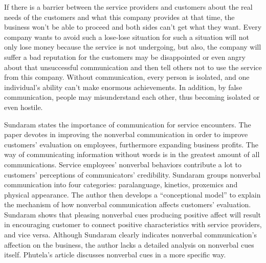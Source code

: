 \documentclass[12pt]{article}
\begin{document}
\begin{flushleft}
If there is a barrier between the service providers and customers about the real
needs of the customers and what this company provides at that time, the
business won't be able to proceed and both sides can't get what they want. Every
company wants to avoid such a lose-lose situation for such a situation will not
only lose money because the service is not undergoing, but also, the company
will suffer a bad reputation for the customers may be disappointed or even angry
about that unsuccessful communication and then tell others not to use the
service from this company.
Without communication, every person is isolated, and one individual's ability
can't make enormous achievements. In addition, by false communication, people
may misunderstand each other, thus becoming isolated or even hostile.


Sundaram states the importance of communication for service encounters.
The paper devotes in improving the nonverbal communication in order to improve
customers' evaluation on employees, furthermore expanding business profits. 
The way of communicating information without words is in the greatest amount of all
communications. Service employees' nonverbal behaviors contribute a lot to
customers' perceptions of communicators' credibility. Sundaram groups nonverbal
communication into four categories: paralanguage, kinetics, proxemics and
physical appearance. The author then develops a ``conceptional model'' to
explain the mechanism of how nonverbal communication affects customers'
evaluation. Sundaram shows that pleasing nonverbal cues producing positive
affect will result in encouraging customer to connect positive characteristics
with service providers, and vice versa. Although Sundaram clearly indicates 
nonverbal communication's affection on the business, the author lacks a detailed
analysis on nonverbal cues itself. Phutela's article discusses nonverbal cues in
a more specific way.


\end{flushleft}
\end{document}
